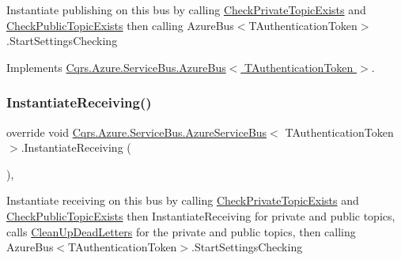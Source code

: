 Instantiate publishing on this bus by calling \hyperlink{classCqrs_1_1Azure_1_1ServiceBus_1_1AzureServiceBus_ab0cafe4b76db0e35dce9b04cba464c50_ab0cafe4b76db0e35dce9b04cba464c50}{Check\+Private\+Topic\+Exists} and \hyperlink{classCqrs_1_1Azure_1_1ServiceBus_1_1AzureServiceBus_a4938623573b2aa81b295a247cb76c9ff_a4938623573b2aa81b295a247cb76c9ff}{Check\+Public\+Topic\+Exists} then calling Azure\+Bus$<$\+T\+Authentication\+Token$>$.\+Start\+Settings\+Checking 



Implements \hyperlink{classCqrs_1_1Azure_1_1ServiceBus_1_1AzureBus_a0bacaa4619921333da4a27371c1d6d0a_a0bacaa4619921333da4a27371c1d6d0a}{Cqrs.\+Azure.\+Service\+Bus.\+Azure\+Bus$<$ T\+Authentication\+Token $>$}.

\mbox{\label{classCqrs_1_1Azure_1_1ServiceBus_1_1AzureServiceBus_ad49a2d063279ec98443e7f1d69178cfa_ad49a2d063279ec98443e7f1d69178cfa}} 
\subsubsection{\texorpdfstring{Instantiate\+Receiving()}{InstantiateReceiving()}\hspace{0.1cm}{\footnotesize\ttfamily [1/2]}}
{\footnotesize\ttfamily override void \hyperlink{classCqrs_1_1Azure_1_1ServiceBus_1_1AzureServiceBus}{Cqrs.\+Azure.\+Service\+Bus.\+Azure\+Service\+Bus}$<$ T\+Authentication\+Token $>$.Instantiate\+Receiving (\begin{DoxyParamCaption}{ }\end{DoxyParamCaption})\hspace{0.3cm}{\ttfamily [protected]}, {\ttfamily [virtual]}}



Instantiate receiving on this bus by calling \hyperlink{classCqrs_1_1Azure_1_1ServiceBus_1_1AzureServiceBus_ab0cafe4b76db0e35dce9b04cba464c50_ab0cafe4b76db0e35dce9b04cba464c50}{Check\+Private\+Topic\+Exists} and \hyperlink{classCqrs_1_1Azure_1_1ServiceBus_1_1AzureServiceBus_a4938623573b2aa81b295a247cb76c9ff_a4938623573b2aa81b295a247cb76c9ff}{Check\+Public\+Topic\+Exists} then Instantiate\+Receiving for private and public topics, calls \hyperlink{classCqrs_1_1Azure_1_1ServiceBus_1_1AzureServiceBus_a8d1d5833d49b7793933825f2a13fb8b7_a8d1d5833d49b7793933825f2a13fb8b7}{Clean\+Up\+Dead\+Letters} for the private and public topics, then calling Azure\+Bus$<$\+T\+Authentication\+Token$>$.\+Start\+Settings\+Checking 



